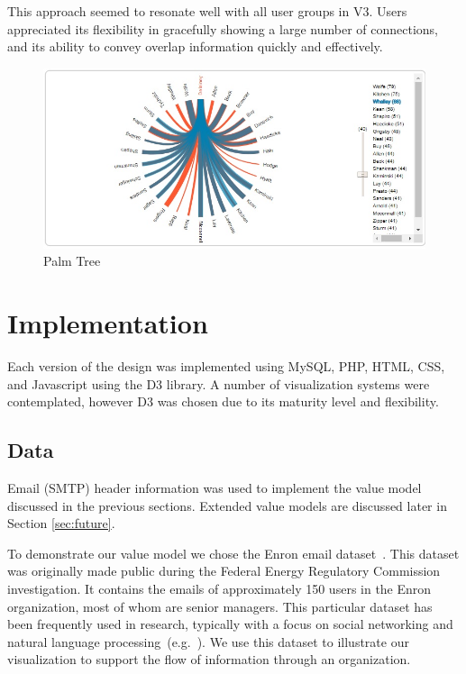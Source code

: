 \documentclass[journal]{vgtc}                %
\begin{document}
This approach seemed to resonate well with all user groups in V3.  Users appreciated its flexibility in gracefully showing a large number of connections, and its ability to convey overlap information quickly and effectively. 

\begin{figure}
	\centering
	\includegraphics[width=\columnwidth]{pictures/palmtree.jpg}
	\caption{Palm Tree}
	\label{fig:palm}
\end{figure}

\section{Implementation}
\label{sec:implementation}
Each version of the design was implemented using MySQL, PHP, HTML, CSS, and Javascript using the D3 library.  A number of visualization systems were contemplated, however D3 was chosen due to its maturity level and flexibility.

\subsection{Data}
Email (SMTP) header information was used to implement the value model discussed in the previous sections. Extended value models are discussed later in Section \ref{sec:future}.

To demonstrate our value model we chose the Enron email dataset~\cite{cmuenron,klimt2004introducing}. This dataset was originally made public during the Federal Energy Regulatory Commission investigation.  It contains the emails of approximately 150 users in the Enron organization, most of whom are senior managers.  This particular dataset has been frequently used in research, typically with a focus on social networking and natural language processing~(e.g.~\cite{diesner2005exploration}). We use this dataset to illustrate our visualization to support the flow of information through an organization.  
\end{document}
